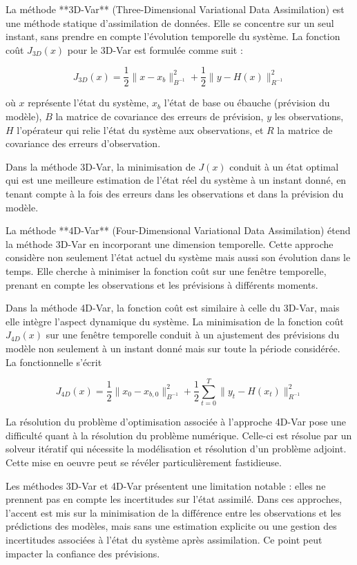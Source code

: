 La méthode **3D-Var** (Three-Dimensional Variational Data Assimilation) est une méthode statique d'assimilation de données. Elle se concentre sur un seul instant, sans prendre en compte l'évolution temporelle du système. La fonction coût $J_{3D}(x)$ pour le 3D-Var est formulée comme suit :

$$J_{3D}(x) = \frac{1}{2}\|x-x_b\|_{B^{-1}}^2+ \frac{1}{2}\|y-H(x)\|^2_{R^{-1}}$$

où $x$ représente l'état du système, $x_b$ l'état de base ou ébauche (prévision du modèle), $B$ la matrice de covariance des erreurs de prévision, $y$ les observations, $H$ l'opérateur qui relie l'état du système aux observations, et $R$ la matrice de covariance des erreurs d'observation.

Dans la méthode 3D-Var, la minimisation de $J(x)$ conduit à un état optimal qui est une meilleure estimation de l'état réel du système à un instant donné, en tenant compte à la fois des erreurs dans les observations et dans la prévision du modèle.

La méthode **4D-Var** (Four-Dimensional Variational Data Assimilation) étend la méthode 3D-Var en incorporant une dimension temporelle. Cette approche considère non seulement l'état actuel du système mais aussi son évolution dans le temps. Elle cherche à minimiser la fonction coût sur une fenêtre temporelle, prenant en compte les observations et les prévisions à différents moments.

Dans la méthode 4D-Var, la fonction coût est similaire à celle du 3D-Var, mais elle intègre l'aspect dynamique du système. La minimisation de la fonction coût $J_{4D}(x)$ sur une fenêtre temporelle conduit à un ajustement des prévisions du modèle non seulement à un instant donné mais sur toute la période considérée. La fonctionnelle s'écrit

$$J_{4D}(x) = \frac{1}{2}\|x_0-x_{b,0}\|_{B^{-1}}^2 + \frac{1}{2} \sum_{t=0}^T \|y_t-H(x_t)\|^2_{R^{-1}}$$

La résolution du problème d'optimisation associée à l'approche 4D-Var pose une difficulté quant à la résolution du problème numérique. Celle-ci est résolue par un solveur itératif qui nécessite la modélisation et résolution d'un problème adjoint. Cette mise en oeuvre peut se révéler particulièrement fastidieuse.

Les méthodes 3D-Var et 4D-Var présentent une limitation notable : elles ne prennent pas en compte les incertitudes sur l'état assimilé. Dans ces approches, l'accent est mis sur la minimisation de la différence entre les observations et les prédictions des modèles, mais sans une estimation explicite ou une gestion des incertitudes associées à l'état du système après assimilation. Ce point peut impacter la confiance des prévisions.

